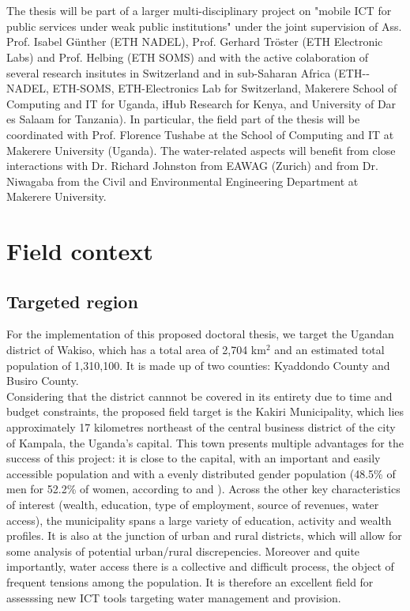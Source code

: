 \documentclass[11pt]{article}
\begin{document}
\\\\
The thesis will be part of a larger multi-disciplinary project on "mobile ICT for public services under weak public institutions" under the joint supervision of Ass. Prof. Isabel Günther (ETH NADEL), Prof. Gerhard Tröster (ETH Electronic Labs) and Prof. Helbing (ETH SOMS) and with the active colaboration of several research insitutes in Switzerland and in sub-Saharan Africa (ETH-­NADEL, ETH-­SOMS, ETH-­Electronics Lab for Switzerland, Makerere School of Computing and IT for Uganda, iHub Research for Kenya, and University of Dar es Salaam for Tanzania). In particular, the field part of the thesis will be coordinated with Prof. Florence Tushabe at the School of Computing and IT at Makerere University (Uganda). The water-related aspects will benefit from close interactions with Dr. Richard Johnston from EAWAG (Zurich) and from Dr. Niwagaba from the Civil and Environmental Engineering Department at Makerere University.  

\section{Field context}
\subsection{Targeted region}
For the implementation of this proposed doctoral thesis, we target the Ugandan district of Wakiso, which has a total area of 2,704 km$^{2}$ and an estimated total population of 1,310,100. It is made up of two counties: Kyaddondo County and Busiro County. 
\\
Considering that the district cannnot be covered in its entirety due to time and budget constraints, the proposed field target is the Kakiri Municipality, which lies approximately 17 kilometres northeast of the central business district of the city of Kampala, the Uganda's capital. This town presents multiple advantages for the success of this project: it is close to the capital, with an important and easily accessible population and with a evenly distributed gender population (48.5\% of men for 52.2\% of women, according to \citep{population2010} and \citep{population02}). Across the other key characteristics of interest (wealth, education, type of employment, source of revenues, water access), the municipality spans a large variety of education, activity and wealth profiles. It is also at the junction of urban and rural districts, which will allow for some analysis of potential urban/rural discrepencies. Moreover and quite importantly, water access there is a collective and difficult process, the object of frequent tensions among the population. It is therefore an excellent field for assesssing new ICT tools targeting water management and provision.
\end{document}
